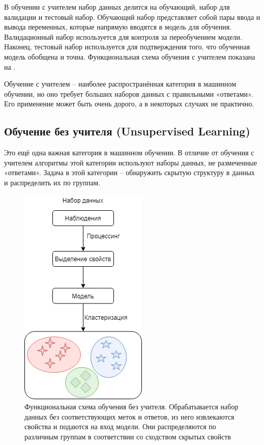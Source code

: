 В обучении с учителем набор данных делится на обучающий, набор для валидации и тестовый набор. Обучающий набор представляет собой пары ввода и вывода переменных, которые напрямую вводятся в модель для обучения. Валидационный набор используется для контроля за переобучением модели. Наконец, тестовый набор используется для подтверждения того, что обученная модель обобщена и точна. Функциональная схема обучения с учителем показана на .

Обучение с учителем -- наиболее распространённая категория в машинном обучении, но оно требует больших наборов данных с правильными «ответами». Его применение может быть очень дорого, а в некоторых случаях не практично.


\subsection{Обучение без учителя (Unsupervised Learning)}

Это ещё одна важная категория в машинном обучении.
В отличие от обучения с учителем алгоритмы этой категории используют наборы данных, не размеченные «ответами». Задача в этой категории -- обнаружить скрытую структуру в данных и распределить их по группам.

\begin{figure}[ht!]
	\center
	\includegraphics [scale=0.60] {my_folder/images/ch1/unsupervised-learning.png}
	\caption{Функциональная схема обучения без учителя. Обрабатывается набор данных без соответствующих меток и ответов, из него извлекаются свойства и подаются на вход модели. Они распределяются по различным группам в соответствии со сходством скрытых свойств}
	\label{fig:unsupervised-learning}
\end{figure}


